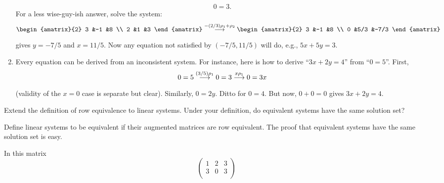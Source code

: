 \begin{exercises}
\begin{answer}
\begin{enumerate}
          \begin{equation*}
            0=3.
          \end{equation*}
          For a less wise-guy-ish answer, solve the system:
          \begin{equation*}
            \begin{amatrix}{2}
              3  &-1  &8  \\
              2  &1   &3
            \end{amatrix}
            \grstep{-(2/3)\rho_1+\rho_2}
            \begin{amatrix}{2}
              3  &-1  &8    \\
              0  &5/3 &-7/3
            \end{amatrix}
          \end{equation*}
          gives \( y=-7/5 \) and \( x=11/5 \).
          Now any equation not satisfied by \( (-7/5,11/5) \) will do,
          e.g., \( 5x+5y=3 \).
        \item Every equation can be derived from an inconsistent system.
          For instance, here is how to derive ``\( 3x+2y=4 \)'' from
          ``\( 0=5 \)''.
          First,
          \begin{equation*}
            0=5
            \mathrel{ \mathop{\longrightarrow}\limits^{(3/5)\rho_1\mathstrut}_{ \begin{subarray}{l} \relax \end{subarray}}}
            0=3
            \mathrel{ \mathop{\longrightarrow}\limits^{x\rho_1\mathstrut}_{ \begin{subarray}{l} \relax \end{subarray}}}
            0=3x
          \end{equation*}
          (validity of the \( x=0 \) case is separate but clear).
          Similarly, \( 0=2y \).
          Ditto for \( 0=4 \).
          But now, \( 0+0=0 \) gives \( 3x+2y=4 \).
     \end{enumerate}  
    \end{answer}
  \item 
    Extend the definition of row equivalence to linear systems.
    Under your definition, do equivalent systems have the same solution set?
    \cite{HoffmanKunze}
    \begin{answer}
      Define linear systems to be equivalent if their augmented
      matrices are row equivalent.
      The proof that equivalent systems have the same solution set is easy.  
    \end{answer}
  \recommended \item 
    In this matrix
    \begin{equation*}
      \begin{pmatrix}
        1  &2  &3  \\
        3  &0  &3  \\

\end{pmatrix}
\end{equation*}
\end{exercises}
